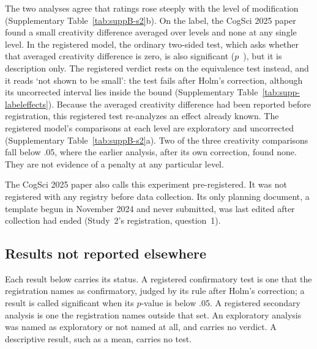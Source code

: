 The two analyses agree that ratings rose steeply with the level of modification (Supplementary Table~\ref{tab:suppB-s2}b). On the label, the CogSci 2025 paper found a small creativity difference averaged over levels and none at any single level. In the registered model, the ordinary two-sided test, which asks whether that averaged creativity difference is zero, is also significant ($p$~\STwoCreatPenaltyP), but it is description only. The registered verdict rests on the equivalence test instead, and it reads `not shown to be small': the test fails after Holm's correction, although its uncorrected interval lies inside the bound (Supplementary Table~\ref{tab:supp-labeleffects}). Because the averaged creativity difference had been reported before registration, this registered test re-analyzes an effect already known. The registered model's comparisons at each level are exploratory and uncorrected (Supplementary Table~\ref{tab:suppB-s2}a). Two of the three creativity comparisons fall below .05, where the earlier analysis, after its own correction, found none. They are not evidence of a penalty at any particular level.

The CogSci 2025 paper also calls this experiment pre-registered. It was not registered with any registry before data collection. Its only planning document, a template begun in November 2024 and never submitted, was last edited after collection had ended (Study~2's registration, question~1).

\subsection*{Results not reported elsewhere}

Each result below carries its status. A registered confirmatory test is one that the registration names as confirmatory, judged by its rule after Holm's correction; a result is called significant when its $p$-value is below .05. A registered secondary analysis is one the registration names outside that set. An exploratory analysis was named as exploratory or not named at all, and carries no verdict. A descriptive result, such as a mean, carries no test.

